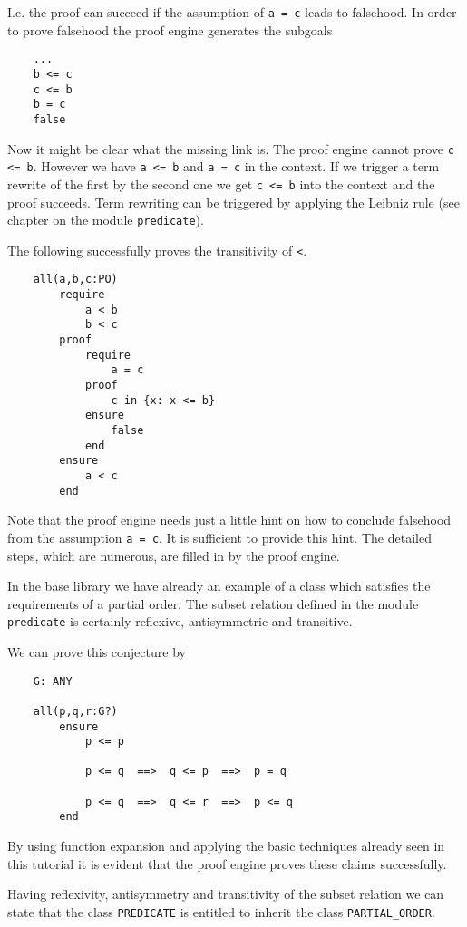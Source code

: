 I.e. the proof can succeed if the assumption of \lstinline!a = c! leads to
falsehood. In order to prove falsehood the proof engine generates the subgoals
\begin{lstlisting}
    ...
    b <= c
    c <= b
    b = c
    false
\end{lstlisting}
Now it might be clear what the missing link is. The proof engine cannot prove
\lstinline!c <= b!. However we have \lstinline!a <= b! and \lstinline!a = c!
in the context. If we trigger a term rewrite of the first by the second one we
get \lstinline!c <= b! into the context and the proof succeeds. Term rewriting
can be triggered by applying the Leibniz rule (see chapter on the module
\lstinline!predicate!).

The following successfully proves the transitivity of \lstinline!<!.

\begin{lstlisting}
    all(a,b,c:PO)
        require
            a < b
            b < c
        proof
            require
                a = c
            proof
                c in {x: x <= b}
            ensure
                false
            end
        ensure
            a < c
        end
\end{lstlisting}
Note that the proof engine needs just a little hint on how to conclude
falsehood from the assumption \lstinline!a = c!. It is sufficient to provide
this hint. The detailed steps, which are numerous, are filled in by the proof
engine.

In the base library we have already an example of a class which satisfies the
requirements of a partial order. The subset relation defined in the module
\lstinline!predicate! is certainly reflexive, antisymmetric and transitive.

We can prove this conjecture by
\begin{lstlisting}
    G: ANY

    all(p,q,r:G?)
        ensure
            p <= p

            p <= q  ==>  q <= p  ==>  p = q

            p <= q  ==>  q <= r  ==>  p <= q
        end
\end{lstlisting}
By using function expansion and applying the basic techniques already seen in
this tutorial it is evident that the proof engine proves these claims
successfully.

Having reflexivity, antisymmetry and transitivity of the subset relation we
can state that the class \lstinline!PREDICATE! is entitled to inherit the
class \lstinline!PARTIAL_ORDER!.

